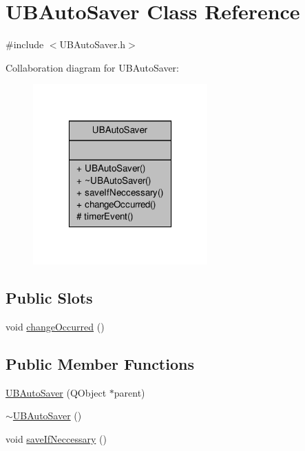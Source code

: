 \hypertarget{class_u_b_auto_saver}{\section{U\-B\-Auto\-Saver Class Reference}
\label{dd/d3b/class_u_b_auto_saver}
}


{\ttfamily \#include $<$U\-B\-Auto\-Saver.\-h$>$}



Collaboration diagram for U\-B\-Auto\-Saver\-:
\nopagebreak
\begin{figure}[H]
\begin{center}
\leavevmode
\includegraphics[width=190pt]{dc/d95/class_u_b_auto_saver__coll__graph}
\end{center}
\end{figure}
\subsection*{Public Slots}
\begin{DoxyCompactItemize}
\item 
void \hyperlink{class_u_b_auto_saver_a3b7247fb354306120ff74fff03ed7135}{change\-Occurred} ()
\end{DoxyCompactItemize}
\subsection*{Public Member Functions}
\begin{DoxyCompactItemize}
\item 
\hyperlink{class_u_b_auto_saver_a45686ca32c187b91b9e9fb79a23a6ae9}{U\-B\-Auto\-Saver} (Q\-Object $\ast$parent)
\item 
\hyperlink{class_u_b_auto_saver_ab01926a852e5b362695e713b0a05f924}{$\sim$\-U\-B\-Auto\-Saver} ()
\item 
void \hyperlink{class_u_b_auto_saver_add0bbcc4aaba6dcffdaa789a58dabb13}{save\-If\-Neccessary} ()
\end{DoxyCompactItemize}
